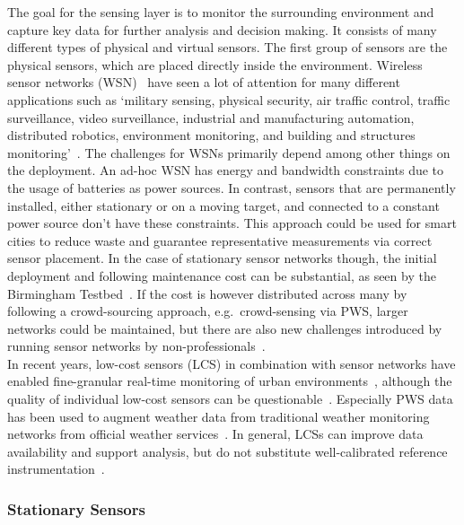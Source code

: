 The goal for the sensing layer is to monitor the surrounding environment and capture key data for further analysis and decision making. It consists of many different types of physical and virtual sensors. The first group of sensors are the physical sensors, which are placed directly inside the environment. Wireless sensor networks (WSN)~\cite{dargie2010fundamentals} have seen a lot of attention for many different applications such as `military sensing, physical security, air traffic control, traffic surveillance, video surveillance, industrial and manufacturing automation, distributed robotics, environment monitoring, and building and structures monitoring'~\cite{chong2003sensor}. The challenges for WSNs primarily depend among other things on the deployment. An ad-hoc WSN has energy and bandwidth constraints due to the usage of batteries as power sources.
In contrast, sensors that are permanently installed, either stationary or on a moving target, and connected to a constant power source don't have these constraints. This approach could be used for smart cities to reduce waste and guarantee representative measurements via correct sensor placement. In the case of stationary sensor networks though, the initial deployment and following maintenance cost can be substantial, as seen by the Birmingham Testbed~\cite{chapman2015birmingham}. If the cost is however distributed across many by following a crowd-sourcing approach, e.g.\ crowd-sensing via PWS, larger networks could be maintained, but there are also new challenges introduced by running sensor networks by non-professionals~\cite{meier2017crowdsourcing}.\\
In recent years, low-cost sensors (LCS) in combination with sensor networks have enabled fine-granular real-time monitoring of urban environments~\cite{grimmond2006progress, rundel2009environmental}, although the quality of individual low-cost sensors can be questionable~\cite{castell2017can}. Especially PWS data has been used to augment weather data from traditional weather monitoring networks from official weather services~\cite{hahn2022observations}. In general, LCSs can improve data availability and support analysis, but do not substitute well-calibrated reference instrumentation~\cite{lewis2018low}.

\subsubsection{Stationary Sensors}

